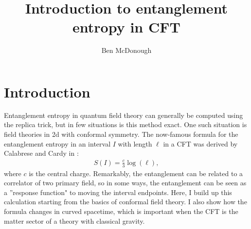 

\newcommand{\e}{\mathrm e}
\newcommand{\spec}{\operatorname{spec}}
\newcommand{\ii}{\mathrm i}
\newcommand{\C}{\mathbb C}
\newcommand{\kb}{k_{\mathrm{B}}}
\newcommand{\ext}{\mathrm{ext}}
\newcommand{\rad}{\mathcal R}
\newcommand{\PT}{T_{\mathrm{P}}}


\title{Introduction to entanglement entropy in CFT}
\author{Ben McDonough}
\maketitle


\section{Introduction}\label{sec:calabrese_cardy}
Entanglement entropy in quantum field theory can generally be computed using the replica trick, but in few situations is this method exact. One such situation is field theories in 2d with conformal symmetry. The now-famous formula for the entanglement entropy in an interval $I$ with length $\ell$ in a CFT was derived by Calabrese and Cardy in \cite{entanglement-CFT, entanglement-QFT}:
\begin{align}
    S(I) = \frac{c}{3}\log(\ell),
\end{align}
where $c$ is the central charge. Remarkably, the entanglement can be related to a correlator of two primary field, so in some ways, the entanglement can be seen as a ''response function" to moving the interval endpoints. 
Here, I build up this calculation starting from the basics of conformal field theory. I also show how the formula changes in curved spacetime, which is important when the CFT is the matter sector of a theory with classical gravity.


